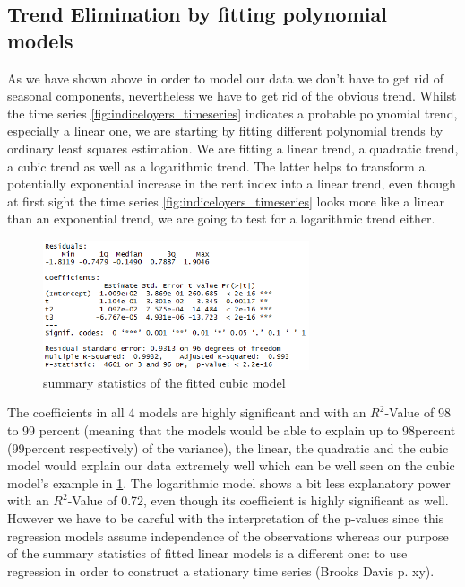 \documentclass[11pt,a4paper]{article}
\begin{document}
\subsection{Trend Elimination by fitting polynomial models}
As we have shown above in order to model our data we don't have to get rid of seasonal components, nevertheless we have to get rid of the obvious trend. Whilst the time series \ref{fig:indiceloyers_timeseries} indicates a probable polynomial trend, especially a linear one, we are starting by fitting different polynomial trends by ordinary least squares estimation. We are fitting a linear trend, a quadratic trend, a cubic trend as well as a logarithmic trend. The latter  helps to transform a potentially exponential increase in the rent index into a linear trend, even though at first sight the time series \ref{fig:indiceloyers_timeseries} looks more like a linear than an exponential trend, we are going to test for a logarithmic trend either.
\\
\begin{figure}
\centering
\includegraphics[angle=0,
width=0.7\textwidth]{summary_cubicmodel}
\caption{summary statistics of the fitted cubic model\label{fig:summary_cubicmodel}}
\end{figure}
The coefficients in all 4 models are highly significant and with an $R^2$-Value of 98 to 99 percent (meaning that the models would be able to explain up to 98percent (99percent respectively) of the variance), the linear, the quadratic and the cubic model would explain our data extremely well which can be well seen on the cubic model's example in \ref{fig:summary_cubicmodel}. The logarithmic model shows a bit less explanatory power with an $R^2$-Value of 0.72, even though its coefficient is highly significant as well. However we have to be careful with the interpretation of the p-values since this regression models assume independence of the observations whereas our purpose of the summary statistics of fitted linear models is a different one: to use regression in order to construct a stationary time series (Brooks Davis p. xy). 
\end{document}
